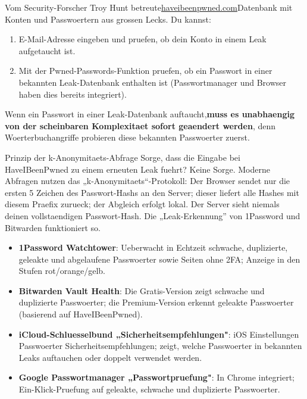 Vom Security-Forscher Troy Hunt betreute\href{https://haveibeenpwned.com}{haveibeenpwned.com}Datenbank mit Konten und Passwoertern aus grossen Lecks. Du kannst:

\begin{enumerate}
  \item E-Mail-Adresse eingeben und pruefen, ob dein Konto in einem Leak aufgetaucht ist.
  \item Mit der Pwned-Passwords-Funktion pruefen, ob ein Passwort in einer bekannten Leak-Datenbank enthalten ist (Passwortmanager und Browser haben dies bereits integriert).
\end{enumerate}

Wenn ein Passwort in einer Leak-Datenbank auftaucht,\textbf{muss es unabhaengig von der scheinbaren Komplexitaet sofort geaendert werden}, denn Woerterbuchangriffe probieren diese bekannten Passwoerter zuerst.

\begin{tcbinfo}{Prinzip der k-Anonymitaets-Abfrage}
Sorge, dass die Eingabe bei HaveIBeenPwned zu einem erneuten Leak fuehrt? Keine Sorge. Moderne Abfragen nutzen das „k-Anonymitaets“-Protokoll: Der Browser sendet nur die ersten 5 Zeichen des Passwort-Hashs an den Server; dieser liefert alle Hashes mit diesem Praefix zurueck; der Abgleich erfolgt lokal. Der Server sieht niemals deinen vollstaendigen Passwort-Hash. Die „Leak-Erkennung” von 1Password und Bitwarden funktioniert so.

\end{tcbinfo}


\begin{itemize}
  \item \textbf{1Password Watchtower}: Ueberwacht in Echtzeit schwache, duplizierte, geleakte und abgelaufene Passwoerter sowie Seiten ohne 2FA; Anzeige in den Stufen rot/orange/gelb.
  \item \textbf{Bitwarden Vault Health}: Die Gratis-Version zeigt schwache und duplizierte Passwoerter; die Premium-Version erkennt geleakte Passwoerter (basierend auf HaveIBeenPwned).
  \item \textbf{iCloud-Schluesselbund „Sicherheitsempfehlungen"}: iOS Einstellungen Passwoerter Sicherheitsempfehlungen; zeigt, welche Passwoerter in bekannten Leaks auftauchen oder doppelt verwendet werden.
  \item \textbf{Google Passwortmanager „Passwortpruefung"}: In Chrome integriert; Ein-Klick-Pruefung auf geleakte, schwache und duplizierte Passwoerter.
\end{itemize}


